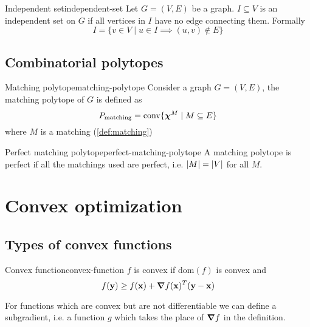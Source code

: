 \documentclass[12pt]{extarticle}
\renewcommand{\vec}[1]{\bvec{#1}}
\numberwithin{equation}{subsection}
\begin{document}
\begin{definition}{Independent set}{independent-set}
	Let $G = (V, E)$ be a graph. $I \subseteq V$ is an independent set on $G$ if all vertices in $I$
	have no edge connecting them. Formally
	\begin{equation}
		I = \{ v \in V \mid u \in I \implies (u, v) \notin E \}
	\end{equation}
\end{definition}

\subsection{Combinatorial polytopes}

\begin{definition}{Matching polytope}{matching-polytope}
	Consider a graph $G = (V, E)$, the matching polytope of $G$ is defined as
	\begin{equation}
		P_\text{matching} = \conv\{ \vec \chi^M \mid M \subseteq E\}
	\end{equation}
	where $M$ is a matching (\cref{def:matching})
\end{definition}

\begin{definition}{Perfect matching polytope}{perfect-matching-polytope}
	A matching polytope is perfect if all the matchings used are perfect, i.e. $\abs{M} = \abs{V}$ for
	all $M$.
\end{definition}

\section{Convex optimization}

\subsection{Types of convex functions}

\begin{definition}{Convex function}{convex-function}
	$f$ is convex if $\mathrm{dom}(f)$ is convex and
	\begin{equation}
		f(\vec y) \geq f(\vec x) + \grad f(\vec x)^T (\vec y - \vec x)
	\end{equation}
\end{definition}

For functions which are convex but are not differentiable we can define a subgradient, i.e. a
function $g$ which takes the place of $\grad f$ in the definition.
\end{document}
